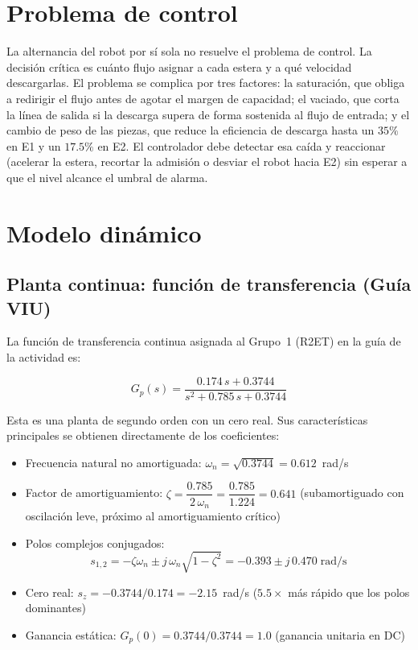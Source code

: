 \section{Problema de control}

La alternancia del robot por sí sola no resuelve el problema de control. La decisión crítica es cuánto flujo asignar a cada estera y a qué velocidad descargarlas. El problema se complica por tres factores: la saturación, que obliga a redirigir el flujo antes de agotar el margen de capacidad; el vaciado, que corta la línea de salida si la descarga supera de forma sostenida al flujo de entrada; y el cambio de peso de las piezas, que reduce la eficiencia de descarga hasta un $35\%$ en E1 y un $17.5\%$ en E2. El controlador debe detectar esa caída y reaccionar (acelerar la estera, recortar la admisión o desviar el robot hacia E2) sin esperar a que el nivel alcance el umbral de alarma.

\section{Modelo dinámico}

\subsection*{Planta continua: función de transferencia (Guía VIU)}

La función de transferencia continua asignada al Grupo~1 (R2ET) en la guía de la actividad es:

\begin{equation}
G_p(s) = \frac{0.174\,s + 0.3744}{s^2 + 0.785\,s + 0.3744}
\label{eq:planta_continua}
\end{equation}

Esta es una planta de segundo orden con un cero real. Sus características principales se obtienen directamente de los coeficientes:

\begin{itemize}
  \item Frecuencia natural no amortiguada: $\omega_n = \sqrt{0.3744} = 0.612$~rad/s
  \item Factor de amortiguamiento: $\zeta = \dfrac{0.785}{2\,\omega_n} = \dfrac{0.785}{1.224} = 0.641$ \quad (subamortiguado con oscilación leve, próximo al amortiguamiento crítico)
  \item Polos complejos conjugados:
        \[s_{1,2} = -\zeta\omega_n \pm j\,\omega_n\sqrt{1-\zeta^2}
                  = -0.393 \pm j\,0.470 \;\text{rad/s}\]
  \item Cero real: $s_z = -0.3744/0.174 = -2.15$~rad/s \quad ($5.5\times$ más rápido que los polos dominantes)
  \item Ganancia estática: $G_p(0) = 0.3744/0.3744 = 1.0$ (ganancia unitaria en DC)
\end{itemize}

